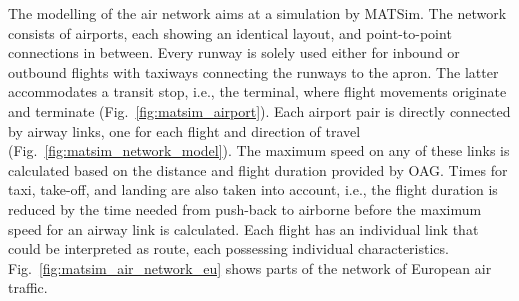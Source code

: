 The modelling of the air network aims at a simulation by MATSim. %
The network consists of airports, each showing an identical layout, and point-to-point connections in between. 
Every runway is solely used either for inbound or outbound flights with taxiways connecting the runways to the apron. The latter accommodates a transit stop, i.e., the terminal, where flight movements originate and terminate (Fig.~\ref{fig:matsim_airport}). 
Each airport pair is directly connected by airway links, one for each flight and direction of travel (Fig.~\ref{fig:matsim_network_model}). 
The maximum speed on any of these links is calculated based on the distance and flight duration provided by OAG. 
Times for taxi, take-off, and landing are also taken into account, i.e., the flight duration is reduced by the time needed from push-back to airborne before the maximum speed for an airway link is calculated.
Each flight has an individual link that could be interpreted as route, each possessing individual characteristics. 
Fig.~\ref{fig:matsim_air_network_eu} shows parts of the network of European air traffic.

